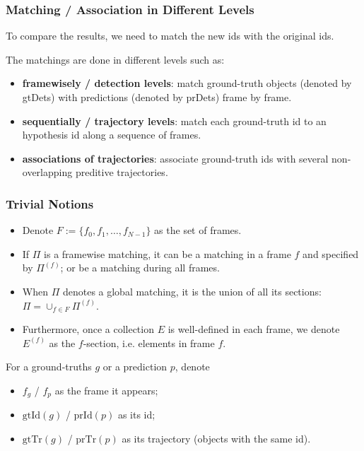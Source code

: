 \documentclass[slidetop, mathserif]{beamer}
\begin{document}
\begin{frame}
	\frametitle{Matching / Association in Different Levels}
			
	To compare the results, we need to match the new ids
	with the original ids.
		
	\vspace{4pt}
			
	The matchings are done in different levels such as:
	\begin{itemize}
		\item {\bf framewisely / detection levels}:
		      match ground-truth objects (denoted by gtDets)
		      with predictions (denoted by prDets) frame by frame.
		\item {\bf sequentially / trajectory levels}:
		      match each ground-truth id to an hypothesis id along a sequence of frames.
		\item {\bf associations of trajectories}:
		      associate ground-truth ids with several non-overlapping preditive trajectories.
	\end{itemize}
		
			
\end{frame}

\begin{frame}
	\frametitle{Trivial Notions}
			
	\begin{itemize}
		\item Denote $F:=\{f_0, f_1, \ldots, f_{N-1}\}$ as the set of frames.
		\item If $\Pi$ is a framewise matching, it can be a matching in a frame $f$ and specified by $\Pi^{(f)}$;
		      or be a matching during all frames.
		\item When $\Pi$ denotes a global matching, it is the union of all its sections:
		      $\Pi = \cup_{f\in F}\Pi^{(f)}$.
		\item Furthermore, once a collection $E$ is well-defined in each frame,
		      we denote $E^{(f)}$ as the $f$-section, i.e. elements in frame $f$.
		      		      		      
	\end{itemize}
			
	For a ground-truths $g$ or a prediction $p$, denote
	\begin{itemize}
		\item $f_g$ / $f_p$ as the frame it appears;
		\item $\text{gtId}(g)$ / $\text{prId}(p)$ as its id;
		\item $\text{gtTr}(g)$ / $\text{prTr}(p)$ as its trajectory (objects with the same id).
	\end{itemize}
\end{frame}
\end{document}
